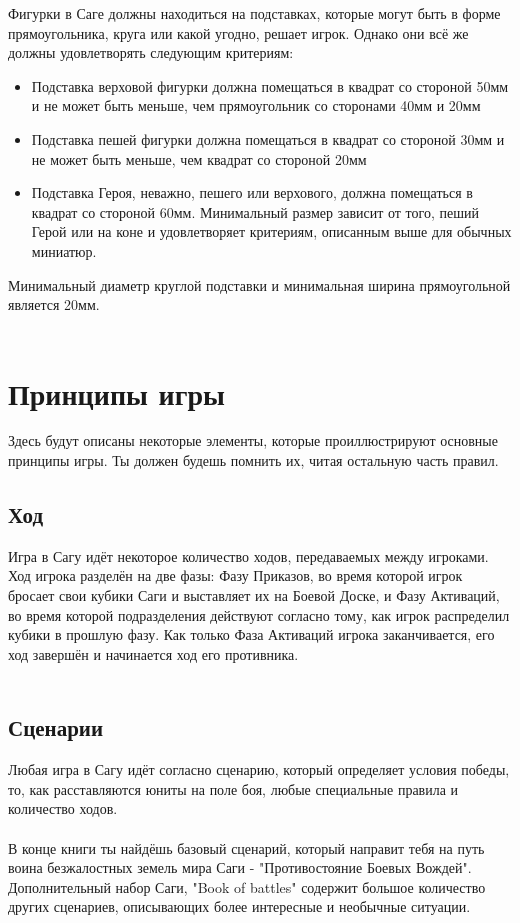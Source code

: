\documentclass[a4paper,11pt,twoside]{article}
\begin{document}
Фигурки в Саге должны находиться на подставках, которые могут быть в форме прямоугольника, круга или какой угодно, решает игрок. Однако они всё же должны удовлетворять следующим критериям:
\begin{itemize}
\item Подставка верховой фигурки должна помещаться в квадрат со стороной 50мм и не может быть меньше, чем прямоугольник со сторонами 40мм и 20мм
\item Подставка пешей фигурки должна помещаться в квадрат со стороной 30мм и не может быть меньше, чем квадрат со стороной 20мм
\item Подставка Героя, неважно, пешего или верхового, должна помещаться в квадрат со стороной 60мм. Минимальный размер зависит от того, пеший Герой или на коне и удовлетворяет критериям, описанным выше для обычных миниатюр.
\end{itemize} 
Минимальный диаметр круглой подставки и минимальная ширина прямоугольной является 20мм. \\ \\

\section*{Принципы игры}

Здесь будут описаны некоторые элементы, которые проиллюстрируют основные принципы игры. Ты должен будешь помнить их, читая остальную часть правил.

\subsection*{Ход}

Игра в Сагу идёт некоторое количество ходов, передаваемых между игроками. Ход игрока разделён на две фазы: Фазу Приказов, во время которой игрок бросает свои кубики Саги и выставляет их на Боевой Доске, и Фазу Активаций, во время которой подразделения действуют согласно тому, как игрок распределил кубики в прошлую фазу. Как только Фаза Активаций игрока заканчивается, его ход завершён и начинается ход его противника. \\ \\ 

\subsection*{Сценарии}

Любая игра в Сагу идёт согласно сценарию, который определяет условия победы, то, как расставляются юниты на поле боя, любые специальные правила и количество ходов. \\ \\
В конце книги ты найдёшь базовый сценарий, который направит тебя на путь воина безжалостных земель мира Саги - "Противостояние Боевых Вождей". Дополнительный набор Саги, "Book of battles"  содержит большое количество других сценариев, описывающих более интересные и необычные ситуации. \\ \\
\end{document}
